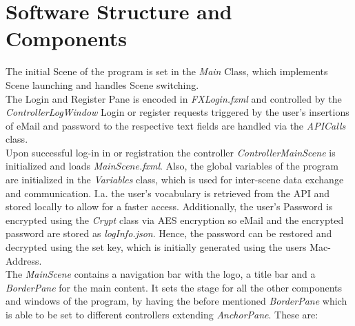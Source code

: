 


\section{Software Structure and Components}
The initial Scene of the program is set in the \textit{Main} Class, which implements Scene launching and handles Scene switching.\\
The Login and Register Pane is encoded in \textit{FXLogin.fxml} and controlled by the 
\textit{ControllerLogWindow}
Login or register requests triggered by the user's insertions of eMail and password to the respective text fields are handled via the \textit{APICalls} class.\\
Upon successful log-in in or registration the controller \textit{ControllerMainScene} is initialized and loads \textit{MainScene.fxml}. Also, the global variables of the program are initialized in the \textit{Variables} class, which is used for inter-scene data exchange and communication. I.a. the user's vocabulary is retrieved from the API and stored locally to allow for a faster access.
Additionally, the user's Password is encrypted using the \textit{Crypt} class via AES encryption so eMail and the encrypted password are stored as \textit{logInfo.json}. Hence, the password can be restored and decrypted using the set key, which is initially generated using the users Mac-Address.\\
The \textit{MainScene} contains a navigation bar with the logo, a title bar and a \textit{BorderPane} for the main content.
It sets the stage for all the other components and windows of the program, by having the before mentioned \textit{BorderPane} which is able to be set to different controllers extending \textit{AnchorPane}. These are:

